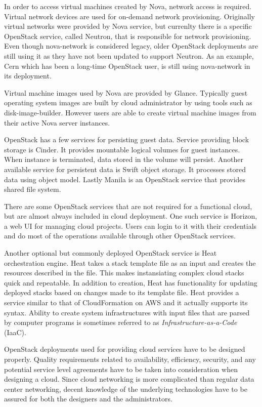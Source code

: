 \documentclass[officiallayout]{tktla}
\begin{document}
In order to access virtual machines created by Nova, network access is
required. Virtual network devices are used for on-demand network provisioning.
Originally virtual networks were provided by Nova service, but currenlty there
is a specific OpenStack service, called Neutron, that is responsible for
network provisioning. Even though nova-network is considered legacy, older
OpenStack deployments are still using it as they have not been updated to
support Neutron. As an example, Cern which has been a long-time OpenStack user,
is still using nova-network in its deployment.

Virtual machine images used by Nova are provided by Glance. Typically guest
operating system images are built by cloud administrator by using tools such as
disk-image-builder. However users are able to create virtual machine images
from their active Nova server instances.

OpenStack has a few services for persisting guest data. Service providing block
storage is Cinder. It provides mountable logical volumes for guest instances.
When instance is terminated, data stored in the volume will persist. Another
available service for persistent data is Swift object storage. It processes
stored data using object model. Lastly Manila is an OpenStack service that
provides shared file system.

There are some OpenStack services that are not required for a functional cloud,
but are almost always included in cloud deployment. One such service is
Horizon, a web UI for managing cloud projects. Users can login to it with their
credentials and do most of the operations available through other OpenStack
services.

Another optional but commonly deployed OpenStack service is Heat orchestration
engine. Heat takes a stack template file as an input and creates the resources
described in the file. This makes instansiating complex cloud stacks quick and
repeatable. In addition to creation, Heat has functionality for updating
deployed stacks based on changes made to its template file. Heat provides a
service similar to that of CloudFormation on AWS and it actually supports its
syntax. Ability to create system infrastructures with input files that are
parsed by computer programs is sometimes referred to as
\textit{Infrastructure-as-a-Code} (IaaC).

OpenStack deployments used for providing cloud services have to be designed
properly. Quality requirements related to availability, efficiency, security,
and any potential service level agreements have to be taken into consideration
when designing a cloud. Since cloud networking is more complicated than regular
data center networking, decent knowledge of the underlying technologies have to
be assured for both the designers and the administrators.
\end{document}
